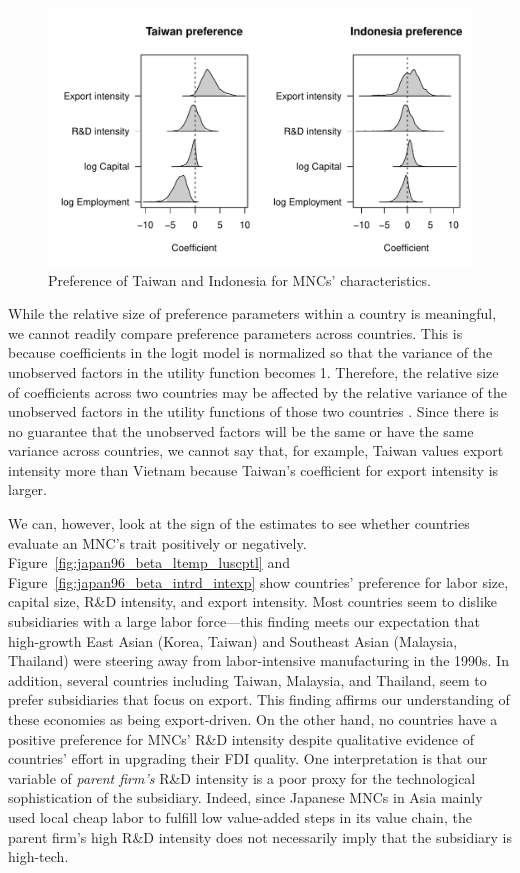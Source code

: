 \begin{figure}[tbp]
  \centering
  \includegraphics[width=\textwidth,keepaspectratio]{../figure/japan96_beta_Taiwan_Indonesia}
  \caption[Preference of Taiwan and Indonesia.]{Preference of Taiwan and
    Indonesia for MNCs' characteristics.}
  \label{fig:japan96_beta_Taiwan_Indonesia}
\end{figure}

While the relative size of preference parameters within a country is meaningful,
we cannot readily compare preference parameters across countries. This is
because coefficients in the logit model is normalized so that the variance of
the unobserved factors in the utility function becomes 1. Therefore, the
relative size of coefficients across two countries may be affected by the
relative variance of the unobserved factors in the utility functions of those
two countries \citep[chap. 2]{Train2009}. Since there is no guarantee that the
unobserved factors will be the same or have the same variance across countries,
we cannot say that, for example, Taiwan values export intensity more than
Vietnam because Taiwan's coefficient for export intensity is larger.

We can, however, look at the sign of the estimates to see whether countries
evaluate an MNC's trait positively or negatively.
Figure~\ref{fig:japan96_beta_ltemp_luscptl} and
Figure~\ref{fig:japan96_beta_intrd_intexp} show countries' preference for labor
size, capital size, R\&D intensity, and export intensity. Most countries seem to
dislike subsidiaries with a large labor force---this finding meets our
expectation that high-growth East Asian (Korea, Taiwan) and Southeast Asian
(Malaysia, Thailand) were steering away from labor-intensive manufacturing in
the 1990s. In addition, several countries including Taiwan, Malaysia, and
Thailand, seem to prefer subsidiaries that focus on export. This finding affirms
our understanding of these economies as being export-driven. On the other hand,
no countries have a positive preference for MNCs' R\&D intensity despite
qualitative evidence of countries' effort in upgrading their FDI quality. One
interpretation is that our variable of \textit{parent firm's} R\&D intensity is
a poor proxy for the technological sophistication of the subsidiary. Indeed,
since Japanese MNCs in Asia mainly used local cheap labor to fulfill low
value-added steps in its value chain, the parent firm's high R\&D intensity does
not necessarily imply that the subsidiary is high-tech.

